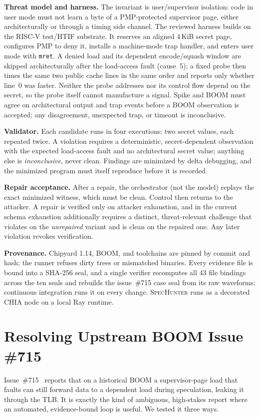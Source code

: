 \documentclass[conference,10pt]{IEEEtran}
\newcommand{\sh}{\textsc{SpecHunter}}
\begin{document}
\textbf{Threat model and harness.} The invariant is user/supervisor isolation:
code in user mode must not learn a byte of a PMP-protected supervisor page, either
architecturally or through a timing side channel. The reviewed harness builds on
the RISC-V test/HTIF substrate. It reserves an aligned 4\,KiB secret page,
configures PMP to deny it, installs a machine-mode trap handler, and enters user
mode with \texttt{mret}. A denied load and its dependent encode/squash window are
skipped architecturally after the load-access fault (cause~5); a fixed probe then
times the same two public cache lines in the same order and reports only whether
line~0 was faster. Neither the probe addresses nor its control flow depend on the
secret, so the probe itself cannot manufacture a signal. Spike and BOOM must
agree on architectural output and trap events before a BOOM observation is
accepted; any disagreement, unexpected trap, or timeout is inconclusive.

\textbf{Validator.} Each candidate runs in four executions: two secret values,
each repeated twice. A violation requires a deterministic, secret-dependent
observation with the expected load-access fault and no architectural secret
value; anything else is \emph{inconclusive}, never clean. Findings are
minimized by delta debugging, and the minimized program must itself reproduce
before it is recorded.

\textbf{Repair acceptance.} After a repair, the orchestrator (not the model)
replays the exact minimized witness, which must be clean. Control then returns
to the attacker. A repair is verified only on attacker exhaustion, and in
the current schema exhaustion additionally requires a distinct, threat-relevant
challenge that violates on the \emph{unrepaired} variant and is clean on the
repaired one. Any later violation revokes verification.

\textbf{Provenance.} Chipyard 1.14, BOOM, and toolchains are pinned by commit and
hash; the runner refuses dirty trees or mismatched binaries. Every evidence file
is bound into a SHA-256 seal, and a single verifier recomputes all 43 file
bindings across the ten seals and rebuilds the issue~\#715 case seal from its raw
waveforms; continuous integration runs it on every change. \sh{} runs as a
decorated CHIA node on a local Ray runtime.

\section{Resolving Upstream BOOM Issue \#715}\label{sec:715}
Issue~\#715~\cite{issue715} reports that on a historical BOOM a
supervisor-page load that faults can still forward data to a dependent load
during speculation, leaking it through the TLB. It is exactly the kind of
ambiguous, high-stakes report where an automated, evidence-bound loop is useful.
We tested it three ways.
\end{document}
